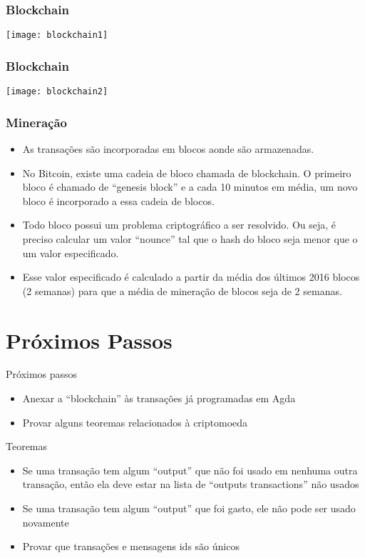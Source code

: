 \documentclass{beamer}
\begin{document}
\begin{frame}
\frametitle{Blockchain}
\texttt{[image: blockchain1]}
\end{frame}

\begin{frame}
\frametitle{Blockchain}
\texttt{[image: blockchain2]}
\end{frame}

\begin{frame}
  \frametitle{Mineração}
  \begin{itemize}
    \item As transações são incorporadas em blocos aonde são armazenadas.
    \item No Bitcoin, existe uma cadeia de bloco chamada de blockchain.
      O primeiro bloco é chamado de \foreignquote{english}{genesis block} e
      a cada 10 minutos em média, um novo bloco é incorporado a essa cadeia de blocos.
    \item Todo bloco possui um problema criptográfico a ser resolvido. Ou seja,
      é preciso calcular um valor \foreignquote{english}{nounce} tal que o hash do bloco
      seja menor que o um valor especificado.
    \item Esse valor especificado é calculado a partir da média dos últimos 2016 blocos (2 semanas)
      para que a média de mineração de blocos seja de 2 semanas.
  \end{itemize}
\end{frame}

\section{Próximos Passos}

\begin{frame}{Próximos passos}
  \begin{itemize}
    \item Anexar a \foreignquote{english}{blockchain} às transações já programadas em Agda
    \item Provar alguns teoremas relacionados à criptomoeda
  \end{itemize}
\end{frame}

\begin{frame}{Teoremas}
  \begin{itemize}
    \item Se uma transação tem algum \foreignquote{english}{output} que não foi usado em nenhuma outra transação, 
      então ela deve estar na lista de \foreignquote{english}{outputs transactions} não usados
    \item Se uma transação tem algum \foreignquote{english}{output} que foi gasto, ele não pode ser usado novamente
      \item Provar que transações e mensagens ids são únicos
  \end{itemize}
\end{frame}
\end{document}
